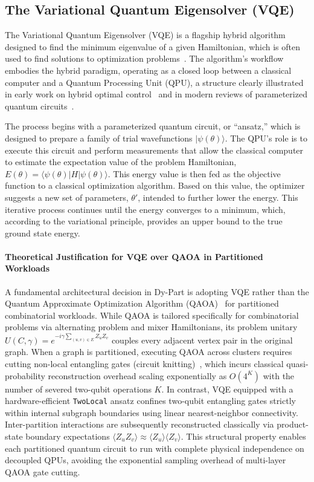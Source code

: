 \documentclass[pdflatex,sn-mathphys-num]{sn-jnl}
\theoremstyle{thmstyleone}
\theoremstyle{thmstyletwo}%
\theoremstyle{thmstylethree}%
\begin{document}
\subsection{The Variational Quantum Eigensolver (VQE)}

The Variational Quantum Eigensolver (VQE) is a flagship hybrid algorithm designed to find the minimum eigenvalue of a given Hamiltonian, which is often used to find solutions to optimization problems~\cite{Peruzzo2013AVEM}. The algorithm's workflow embodies the hybrid paradigm, operating as a closed loop between a classical computer and a Quantum Processing Unit (QPU), a structure clearly illustrated in early work on hybrid optimal control~\cite{Li2016HybridQAW} and in modern reviews of parameterized quantum circuits~\cite{Chang2022ParameterizedQCAP}.

The process begins with a parameterized quantum circuit, or ``ansatz,'' which is designed to prepare a family of trial wavefunctions $|\psi(\theta)\rangle$. The QPU's role is to execute this circuit and perform measurements that allow the classical computer to estimate the expectation value of the problem Hamiltonian, $E(\theta) = \langle\psi(\theta)|H|\psi(\theta)\rangle$. This energy value is then fed as the objective function to a classical optimization algorithm. Based on this value, the optimizer suggests a new set of parameters, $\theta'$, intended to further lower the energy. This iterative process continues until the energy converges to a minimum, which, according to the variational principle, provides an upper bound to the true ground state energy.

\paragraph{Theoretical Justification for VQE over QAOA in Partitioned Workloads} A fundamental architectural decision in Dy-Part is adopting VQE rather than the Quantum Approximate Optimization Algorithm (QAOA)~\cite{Farhi2014QuantumAO} for partitioned combinatorial workloads. While QAOA is tailored specifically for combinatorial problems via alternating problem and mixer Hamiltonians, its problem unitary $U(C, \gamma) = e^{-i \gamma \sum_{(u,v) \in E} Z_u Z_v}$ couples every adjacent vertex pair in the original graph. When a graph is partitioned, executing QAOA across clusters requires cutting non-local entangling gates (circuit knitting)~\cite{Bhatotia2024QuantumClassicalCVH}, which incurs classical quasi-probability reconstruction overhead scaling exponentially as $O(4^K)$ with the number of severed two-qubit operations $K$. In contrast, VQE equipped with a hardware-efficient \texttt{TwoLocal} ansatz confines two-qubit entangling gates strictly within internal subgraph boundaries using linear nearest-neighbor connectivity. Inter-partition interactions are subsequently reconstructed classically via product-state boundary expectations $\langle Z_u Z_v \rangle \approx \langle Z_u \rangle \langle Z_v \rangle$. This structural property enables each partitioned quantum circuit to run with complete physical independence on decoupled QPUs, avoiding the exponential sampling overhead of multi-layer QAOA gate cutting.
\end{document}
